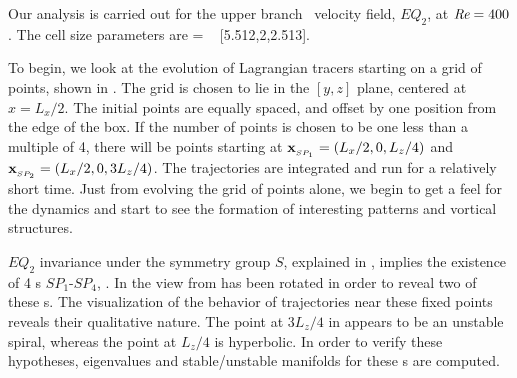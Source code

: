 \documentclass[lineno]{jfm}
\begin{document}
Our analysis is carried out for the upper branch \eqv\ velocity field, 
$EQ_2$, at $\textit{Re} = 400$. 
The cell size parameters are 
\beq   
[L_x,2,L_z]
         = \; [2\pi/1.14,2,4\pi/5]
         ~ [5.512,2,2.513].

To begin, we look at the evolution of Lagrangian tracers starting on a 
grid of points, shown in . The grid is chosen to lie 
in the $[y,z]$ plane, centered at $x = L_x/2$. The initial points are 
equally spaced, and offset by one position from the edge of the box. If 
the number of points is chosen to be one less than a multiple of 4, there 
will be points starting at $\bold{x}_{_{SP_{1}}}=(L_x/2,0,L_z/4)$ and 
$\bold{x}_{_{SP_{2}}}=(L_x/2,0,3L_z/4)$. The trajectories are integrated 
and run for a relatively short time. Just from evolving the 
grid of points alone, we begin to get a feel for the dynamics and start 
to see the formation of interesting patterns and vortical structures. 

$EQ_2$ invariance under the symmetry group $S$, explained  in 
, implies the existence of 4 \stagp s 
$SP_1$-$SP_4$, . In  the view 
from  has been rotated in order to reveal two of 
these \stagp s. The visualization of the behavior of trajectories near 
these fixed points reveals their  qualitative nature. The point at 
$3L_z/4$ in  appears to be an unstable spiral, 
whereas the point at $L_z/4$ is hyperbolic. In order to verify these 
hypotheses, eigenvalues and stable/unstable manifolds for these \stagp s 
are computed. 
\end{document}
